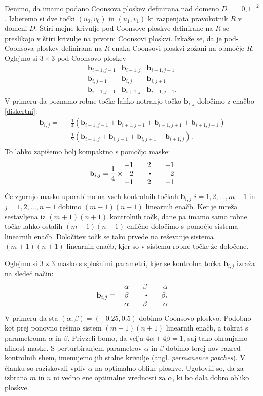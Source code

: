 \documentclass[a4paper,12pt]{article}
\begin{document}
Denimo, da imamo podano Coonsova ploskev definirana nad domeno $D = [0,1]^2$. 
Izberemo si dve točki $(u_0,v_0)$ in $(u_1,v_1)$ ki razpenjata pravokotnik $R$ v domeni $D$. 
Štiri mejne krivulje pod-Coonsove ploskve definirane na $R$ se preslikajo 
v štiri krivulje na prvotni Coonsovi ploskvi. Izkaže se, da je pod-Coonsova ploskev 
definirana na $R$ enaka Coonsovi ploskvi zožani na območje $R$. 
Oglejmo si $3 \times 3$ pod-Coonsovo ploskev
$$
\begin{matrix} 
   \mathbf{b}_{i-1,j-1} & \mathbf{b}_{i-1,j} & \mathbf{b}_{i-1,j+1}\\
   \mathbf{b}_{i,j-1} & \mathbf{b}_{i,j} & \mathbf{b}_{i,j+1}\\
   \mathbf{b}_{i+1,j-1} & \mathbf{b}_{i+1,j} & \mathbf{b}_{i+1,j+1}.
\end{matrix}
$$ 
V primeru da poznamo robne točke lahko notranjo točko $\mathbf{b}_{i,j}$
določimo z enačbo \eqref{diskertni}:  
\begin{align*}
   \mathbf{b}_{i,j} =& -\frac{1}{4}(\mathbf{b}_{i-1,j-1} + \mathbf{b}_{i+1,j-1} +
      \mathbf{b}_{i-1,j+1} + \mathbf{b}_{i+1,j+1}) \\
      &+\frac{1}{2}(\mathbf{b}_{i-1,j} + \mathbf{b}_{i,j-1}+
      \mathbf{b}_{i,j+1} + \mathbf{b}_{i+1,j}).\\
\end{align*}
To lahko zapišemo bolj kompaktno s pomočjo maske:
$$
\mathbf{b}_{i,j} = \frac{1}{4} \times 
\begin{matrix*}[r]
-1 && 2 && -1 \\
2 && \sbullet && 2\\
-1 && 2 && -1
\end{matrix*}
$$
Če zgornjo masko uporabimo na vseh kontrolnih točkah $\mathbf{b}_{i,j}$ $i = 1,2,\dots,m-1$ in $j = 1,2,\dots,n-1$
dobimo $(m-1)(n-1)$ linearnih enačb.
Ker je mreža sestavljena iz $(m+1)(n+1)$ kontrolnih točk, dane pa imamo samo robne
točke lahko ostalih $(m-1)(n-1)$ enlično določimo s pomočjo sistema
linearnih enačb. Določitev točk se tako prvede
na reševanje sistema $(m+1)(n+1)$ linearnih enačb, kjer so v sistemu robne točke že določene.

Oglejmo si $3 \times 3$ masko s splošnimi parametri, kjer se  kontrolna točka 
$\mathbf{b}_{i,j}$ izraža na sledeč način:
$$
\mathbf{b}_{i,j} =  \quad 
\begin{matrix*}[r]
\alpha && \beta && \alpha \\
\beta && \sbullet && \beta. \\
\alpha && \beta && \alpha
\end{matrix*}
$$
V primeru da sta $(\alpha, \beta) = (-0.25, 0.5)$ dobimo Coonsovo
ploskvo. 
Podobno kot prej ponovno rešimo sistem $(m+1)(n+1)$ linearnih enačb, a tokrat
s parametroma $\alpha$ in $\beta$.
Privzeli bomo, da velja $4\alpha + 4\beta = 1$, saj 
tako ohranjamo afinost maske. 
S perturbiranjem parametrov 
$\alpha$ in $\beta$ dobimo torej nov razred kontrolnih shem, imenujemo jih stalne 
krivulje (angl. \textit{permanence patches}). V članku \cite{DCP}  so raziskovali
vpliv $\alpha$ na optimalno oblike ploskve. Ugotovili so, da za izbrana $m$ in $n$
ni vedno ene optimalne vrednosti za $\alpha$, ki bo dala dobro obliko ploskve.
\end{document}
